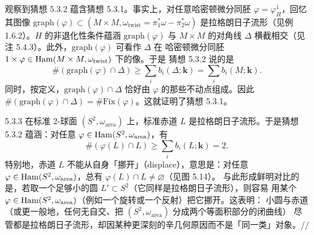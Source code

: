 观察到猜想 5.3.2 蕴含猜想 5.3.1。事实上，对任意哈密顿微分同胚 $\varphi=\varphi_H^1$，回忆其图像
$\mathrm{graph}(\varphi)\subset(M\times M,\omega_{\mathrm{twist}}=\pi_1^*\omega-\pi_2^*\omega)$
是拉格朗日子流形（见例 1.6.2）。$H$ 的非退化性条件蕴涵 $\mathrm{graph}(\varphi)$ 与 $M\times M$
的对角线 $\Delta$ 横截相交（见注 5.4.3）。此外，$\mathrm{graph}(\varphi)$ 可看作 $\Delta$ 在
哈密顿微分同胚 $1\times\varphi\in\operatorname{Ham}(M\times M,\omega_{\mathrm{twist}})$ 下的像。于是
猜想 5.3.2 说的是
\[
  \#(\mathrm{graph}(\varphi)\cap\Delta)\geqslant\sum_i b_i(\Delta;\mathbf{k})
    =\sum_i b_i(M;\mathbf{k}).
\]
同时，按定义，$\mathrm{graph}(\varphi)\cap\Delta$ 恰好由 $\varphi$ 的那些不动点组成。因此
$\#(\mathrm{graph}(\varphi)\cap\Delta)=\#\mathrm{Fix}(\varphi)$。这就证明了猜想 5.3.1。

\begin{wexam}{5.3.3}
  在标准 2-球面 $(S^2,\omega_{\mathrm{area}})$ 上，标准赤道 $L$ 是拉格朗日子流形。于是猜想 5.3.2
  蕴涵：对任意 $\varphi\in\operatorname{Ham}(S^2,\omega_{\mathrm{area}})$，有
  \[
    \#(\varphi(L)\cap L)\geqslant\sum_i b_i(L;\mathbf{k})=2.
  \]
  特别地，赤道 $L$ 不能从自身「挪开」（displace），意思是：对任意
  $\varphi\in\operatorname{Ham}(S^2,\omega_{\mathrm{area}})$，总有 $\varphi(L)\cap L\ne\varnothing$（见图 5.14）。
  与此形成鲜明对比的是，若取一个足够小的圆 $L'\subset S^2$（它同样是拉格朗日子流形），则容易
  用某个 $\varphi\in\operatorname{Ham}(S^2,\omega_{\mathrm{area}})$（例如一个旋转或一个反射）把它挪开。这表明：
  小圆与赤道（或更一般地，任何无自交、把 $(S^2,\omega_{\mathrm{area}})$ 分成两个等面积部分的闭曲线）
  尽管都是拉格朗日子流形，却因某种更深刻的辛几何原因而不是「同一类」对象。\hfill$//$
\end{wexam}

